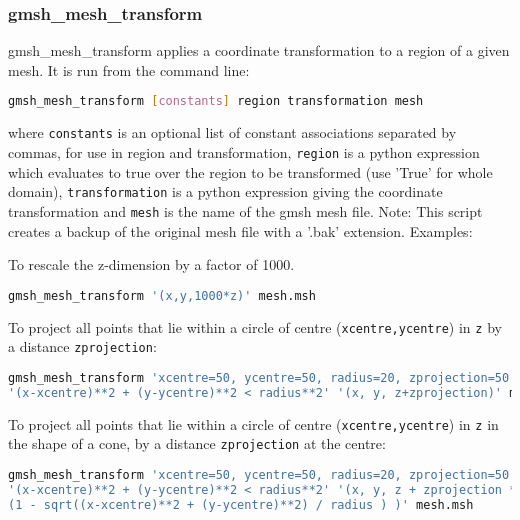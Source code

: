 
\subsubsection{gmsh\_mesh\_transform}
\label{sect:gmsh_mesh_transform}

gmsh\_mesh\_transform applies a coordinate transformation to a region of a given mesh. It is run from the command line:
\begin{lstlisting}[language = Bash]
gmsh_mesh_transform [constants] region transformation mesh
\end{lstlisting}
where \lstinline[language = Bash]+constants+ is an optional list of constant associations separated by commas, for use in region and transformation, \lstinline[language = Bash]+region+ is a python expression which evaluates to true over the region to be transformed (use 'True' for whole domain), \lstinline[language = Bash]+transformation+ is a python expression giving the coordinate transformation and \lstinline[language = Bash]+mesh+ is the name of the gmsh mesh file.
Note: This script creates a backup of the original mesh file with a '.bak' extension.
Examples:

To rescale the z-dimension by a factor of 1000.
\begin{lstlisting}[language = Bash]
gmsh_mesh_transform '(x,y,1000*z)' mesh.msh
\end{lstlisting} 

To project all points that lie within a circle of centre (\lstinline[language = Bash]+xcentre,ycentre+) in \lstinline[language = Bash]+z+ by a distance \lstinline[language = Bash]+zprojection+:
\begin{lstlisting}[language = Bash]
gmsh_mesh_transform 'xcentre=50, ycentre=50, radius=20, zprojection=50'
'(x-xcentre)**2 + (y-ycentre)**2 < radius**2' '(x, y, z+zprojection)' mesh.msh
\end{lstlisting} 

To project all points that lie within a circle of centre (\lstinline[language = Bash]+xcentre,ycentre+) in \lstinline[language = Bash]+z+ in the shape of a cone, by a distance \lstinline[language = Bash]+zprojection+ at the centre:
\begin{lstlisting}[language = Bash]
gmsh_mesh_transform 'xcentre=50, ycentre=50, radius=20, zprojection=50'
'(x-xcentre)**2 + (y-ycentre)**2 < radius**2' '(x, y, z + zprojection *
(1 - sqrt((x-xcentre)**2 + (y-ycentre)**2) / radius ) )' mesh.msh
\end{lstlisting} 

